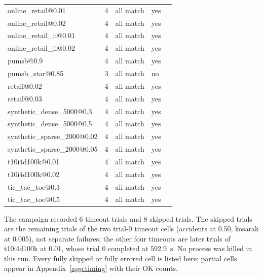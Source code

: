 \documentclass[twocolumn,10pt]{article}
\begin{document}
\begin{table}[t]
\begin{tabular}{p{4.2cm}p{2.2cm}p{2.5cm}p{2.2cm}p{3.5cm}}
online\_retail@0.01 & 4 & all match & yes &  \\
online\_retail@0.02 & 4 & all match & yes &  \\
online\_retail\_ii@0.01 & 4 & all match & yes &  \\
online\_retail\_ii@0.02 & 4 & all match & yes &  \\
pumsb@0.9 & 4 & all match & yes &  \\
pumsb\_star@0.85 & 3 & all match & no &  \\
retail@0.02 & 4 & all match & yes &  \\
retail@0.03 & 4 & all match & yes &  \\
synthetic\_dense\_5000@0.3 & 4 & all match & yes &  \\
synthetic\_dense\_5000@0.5 & 4 & all match & yes &  \\
synthetic\_sparse\_2000@0.02 & 4 & all match & yes &  \\
synthetic\_sparse\_2000@0.05 & 4 & all match & yes &  \\
t10i4d100k@0.01 & 4 & all match & yes &  \\
t10i4d100k@0.02 & 4 & all match & yes &  \\
tic\_tac\_toe@0.3 & 4 & all match & yes &  \\
tic\_tac\_toe@0.5 & 4 & all match & yes &  \\
\bottomrule
\end{tabular}
\end{table}
The campaign recorded 6 timeout trials and 8 skipped trials. The skipped trials are the remaining trials of the two trial-0 timeout cells (accidents at 0.50, kosarak at 0.005), not separate failures; the other four timeouts are later trials of t10i4d100k at 0.01, whose trial 0 completed at 592.9~s. No process was killed in this run. Every fully skipped or fully errored cell is listed here; partial cells appear in Appendix~\ref{app:timing} with their OK counts.
\end{document}
